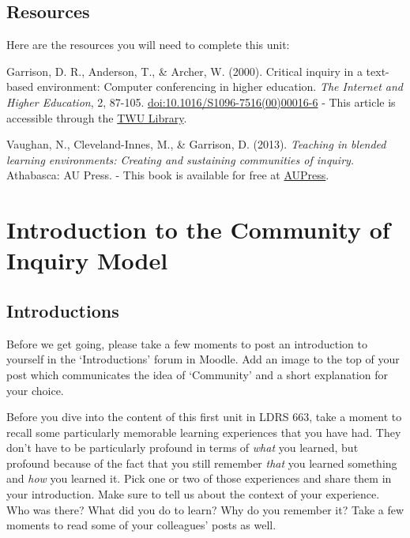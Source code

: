 \documentclass[
]{book}
\begin{document}
\hypertarget{resources-1}{%
\subsection*{Resources}\label{resources-1}}

Here are the resources you will need to complete this unit:

Garrison, D. R., Anderson, T., \& Archer, W. (2000). Critical inquiry in a text-based environment: Computer conferencing in higher education. \emph{The Internet and Higher Education}, 2, 87-105. \url{doi:10.1016/S1096-7516(00)00016-6} - This article is accessible through the \href{http://www.twu.ca/library}{TWU Library}.

Vaughan, N., Cleveland-Innes, M., \& Garrison, D. (2013). \emph{Teaching in blended learning environments: Creating and sustaining communities of inquiry.} Athabasca: AU Press. - This book is available for free at \href{http://www.aupress.ca/index.php/books/120229}{AUPress}.

\hypertarget{introduction-to-the-community-of-inquiry-model}{%
\section*{Introduction to the Community of Inquiry Model}\label{introduction-to-the-community-of-inquiry-model}}

\hypertarget{introductions}{%
\subsection*{Introductions}\label{introductions}}

Before we get going, please take a few moments to post an introduction to yourself in the `Introductions' forum in Moodle. Add an image to the top of your post which communicates the idea of `Community' and a short explanation for your choice.

Before you dive into the content of this first unit in LDRS 663, take a moment to recall some particularly memorable learning experiences that you have had. They don't have to be particularly profound in terms of \emph{what} you learned, but profound because of the fact that you still remember \emph{that} you learned something and \emph{how} you learned it. Pick one or two of those experiences and share them in your introduction. Make sure to tell us about the context of your experience. Who was there? What did you do to learn? Why do you remember it? Take a few moments to read some of your colleagues' posts as well.
\end{document}
